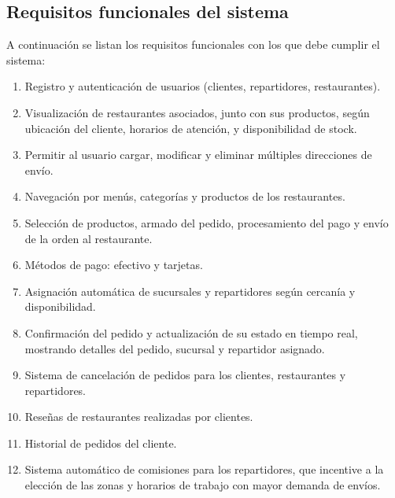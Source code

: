 \subsection{Requisitos funcionales del sistema}

A continuación se listan los requisitos funcionales con los que debe cumplir el sistema:

\begin{enumerate}
    \item Registro y autenticación de usuarios (clientes, repartidores, restaurantes).

    \item Visualización de restaurantes asociados, junto con sus productos, según ubicación del cliente, horarios de atención, y disponibilidad de stock.
    
    \item Permitir al usuario cargar, modificar y eliminar múltiples direcciones de envío.
    
    \item Navegación por menús, categorías y productos de los restaurantes.
    
    \item Selección de productos, armado del pedido, procesamiento del pago y envío de la orden al restaurante.
    
    \item Métodos de pago: efectivo y tarjetas.
    
    \item Asignación automática de sucursales y repartidores según cercanía y disponibilidad.
    
    \item Confirmación del pedido y actualización de su estado en tiempo real, mostrando detalles del pedido, sucursal y repartidor asignado.
    
    \item Sistema de cancelación de pedidos para los clientes, restaurantes y repartidores.
    
    \item Reseñas de restaurantes realizadas por clientes.
    
    \item Historial de pedidos del cliente.
    
    \item Sistema automático de comisiones para los repartidores, que incentive a la elección de las zonas y horarios de trabajo con mayor demanda de envíos.
    

\end{enumerate}
